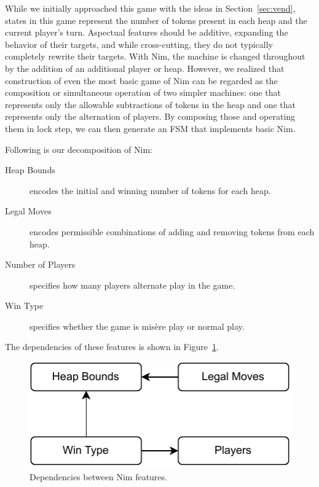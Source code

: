 \documentclass[sigplan,anonymous,review]{acmart}
\begin{document}
While we initially approached this game with the ideas in Section~\ref{sec:vend}, states in this game represent the number of tokens present in each heap and the current player's turn.  Aspectual features should be additive, expanding the behavior of their targets, and while cross-cutting, they do not typically completely rewrite their targets.  With Nim, the machine is changed throughout by the addition of an additional player or heap.   However, we realized that construction of even the most basic game of Nim can be regarded as the composition or simultaneous operation of two simpler machines:   one that represents only the allowable subtractions of tokens in the heap and one that represents only the alternation of players.   By composing those and operating them in lock step, we can then generate an FSM that implements basic Nim.

Following is our decomposition of Nim:
\begin{description}
    \item[Heap Bounds] encodes the initial and winning number of tokens for each heap.
    \item[Legal Moves] encodes permissible combinations of adding and removing tokens from each heap.
    \item[Number of Players] specifies how many players alternate play in the game.
    \item[Win Type] specifies whether the game is mis\`{e}re play or normal play.
\end{description}
The dependencies of these features is shown in Figure~\ref{fig:nimDependencies}.  

\begin{figure}
    \centering
    \includegraphics[width=0.5\linewidth]{figures/NimFeatures.pdf}
    \caption{Dependencies between Nim features.}
    \label{fig:nimDependencies}
\end{figure}
\end{document}
